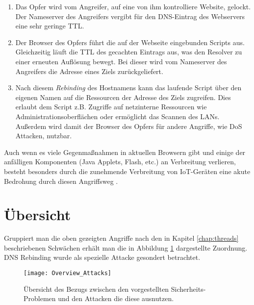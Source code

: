 \begin{enumerate}[topsep=0pt,itemsep=-1ex,partopsep=1ex,parsep=1ex]
    \item Das Opfer wird vom Angreifer, auf eine von ihm kontrolliere Website, gelockt. Der Nameserver des Angreifers vergibt für den DNS-Eintrag des Webservers eine sehr geringe TTL.
    \item Der Browser des Opfers führt die auf der Webseite eingebunden Scripts aus. Gleichzeitig läuft die TTL des gecachten Eintrags aus, was den Resolver zu einer erneuten Auflösung bewegt. Bei dieser wird vom Nameserver des Angreifers die Adresse eines Ziels zurückgeliefert.
    \item Nach diesem \textit{Rebinding} des Hostnamens kann das laufende Script über den eigenen Namen auf die Ressourcen der Adresse des Ziels zugreifen. Dies erlaubt dem Script z.B. Zugriffe auf netzinterne Ressourcen wie Administrationsoberflächen oder ermöglicht das Scannen des LANs. Außerdem wird damit der Browser des Opfers für andere Angriffe, wie \ac{DoS} Attacken, nutzbar.   
\end{enumerate}

Auch wenn es viele Gegenmaßnahmen in aktuellen Browsern gibt und einige der anfälligen Komponenten (Java Applets, Flash, etc.) an Verbreitung verlieren, besteht besonders durch die zunehmende Verbreitung von IoT-Geräten eine akute Bedrohung durch diesen Angriffsweg \cite{Dorsey2018}. 

\section{Übersicht}
Gruppiert man die oben gezeigten Angriffe nach den in Kapitel \ref{chap:threads} beschriebenen Schwächen erhält man die in Abbildung \ref{img:attacks-summary} dargestellte Zuordnung. DNS Rebinding wurde als spezielle Attacke gesondert betrachtet.

\begin{figure}[!hb]
    \centering
    \texttt{[image: Overview\_Attacks]}
    \caption{Übersicht des Bezugs zwischen den vorgestellten Sicherheits-Problemen und den Attacken die diese ausnutzen.}
    \label{img:attacks-summary}
\end{figure}

